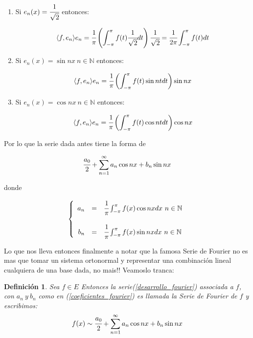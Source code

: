 \documentclass[a4paper,spanish]{article}
\def\N {\mathbb{N}}
\newtheorem{defi}[prop]{Definici\'on}
\numberwithin{equation}{section}
\begin{document}
\begin{enumerate}
\item Si $e_n(x)=\cfrac{1}{\sqrt{2}}$ entonces:

\[\langle{f,e_n}\rangle e_n = \cfrac{1}{\pi}\left({ \int_{-\pi}^{\pi}{f(t)\cfrac{1}{\sqrt{2}}}dt }\right)\cfrac{1}{\sqrt{2}} = \cfrac{1}{2\pi} \int_{-\pi}^{\pi}{f(t)}dt\]

\item Si $e_n(x)=\sin{nx} \ n \in \N$ entonces:

\[\langle{f,e_n}\rangle e_n = \cfrac{1}{\pi}\left({ \int_{-\pi}^{\pi}{f(t)\sin{nt}}dt}\right)\sin{nx}\]

\item Si $e_n(x)=\cos{nx} \ n \in \N$ entonces:

\[\langle{f,e_n}\rangle e_n = \cfrac{1}{\pi}\left({ \int_{-\pi}^{\pi}{f(t)\cos{nt}}dt}\right)\cos{nx}\]
\end{enumerate}

Por lo que la serie dada antes tiene la forma de

\begin{equation}
\cfrac{a_0}{2} + \sum \limits_{n=1}^{\infty}a_n\cos{nx} + b_n \sin{nx}
\label{desarrollo_fourier} 
\end{equation}

donde

\begin{equation}
\left\lbrace \begin{array}{rcl} 
a_n & = & \cfrac{1}{\pi} \int_{-\pi}^{\pi}{f(x)\cos{nx}} dx \ n \in \N \\
& & \\
b_n & = & \cfrac{1}{\pi} \int_{-\pi}^{\pi}{f(x)\sin{nx}} dx \ n \in \N
\end{array} \right.
\label{coeficientes_fourier}
\end{equation}

Lo que nos lleva entonces finalmente a notar que la famosa Serie de Fourier no es mas que tomar un sistema ortonormal y representar una combinaci\'on lineal cualquiera de una base dada, no mais!! Veamoslo tranca:

\begin{defi}
Sea $f \in E$ Entonces la serie(\ref{desarrollo_fourier}) associada a $f$, con $a_n \ y \ b_n$ como en (\ref{coeficientes_fourier}) es llamada la \emph{Serie de Fourier} de $f$ y escribimos:
\[f(x) \sim \cfrac{a_0}{2} + \sum \limits_{n=1}^{\infty}a_n\cos{nx} + b_n \sin{nx} \]
\end{defi}
\end{document}
